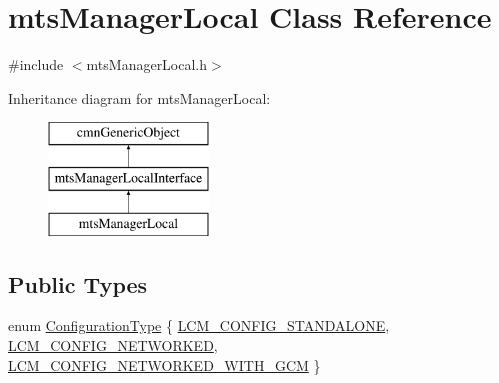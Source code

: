 \hypertarget{classmts_manager_local}{\section{mts\-Manager\-Local Class Reference}
\label{classmts_manager_local}
}


{\ttfamily \#include $<$mts\-Manager\-Local.\-h$>$}

Inheritance diagram for mts\-Manager\-Local\-:\begin{figure}[H]
\begin{center}
\leavevmode
\includegraphics[height=3.000000cm]{d7/de0/classmts_manager_local}
\end{center}
\end{figure}
\subsection*{Public Types}
\begin{DoxyCompactItemize}
\item 
enum \hyperlink{classmts_manager_local_ade8a34bedd1d420d29c591711913046a}{Configuration\-Type} \{ \hyperlink{classmts_manager_local_ade8a34bedd1d420d29c591711913046aa4e71c12d636d0dbb6afb75898bf407bd}{L\-C\-M\-\_\-\-C\-O\-N\-F\-I\-G\-\_\-\-S\-T\-A\-N\-D\-A\-L\-O\-N\-E}, 
\hyperlink{classmts_manager_local_ade8a34bedd1d420d29c591711913046aa3e334852cf7d639a3137f3d783f457c4}{L\-C\-M\-\_\-\-C\-O\-N\-F\-I\-G\-\_\-\-N\-E\-T\-W\-O\-R\-K\-E\-D}, 
\hyperlink{classmts_manager_local_ade8a34bedd1d420d29c591711913046aa3dca58dd8da73f899de5acd8d3e70f26}{L\-C\-M\-\_\-\-C\-O\-N\-F\-I\-G\-\_\-\-N\-E\-T\-W\-O\-R\-K\-E\-D\-\_\-\-W\-I\-T\-H\-\_\-\-G\-C\-M}
 \}
\end{DoxyCompactItemize}
